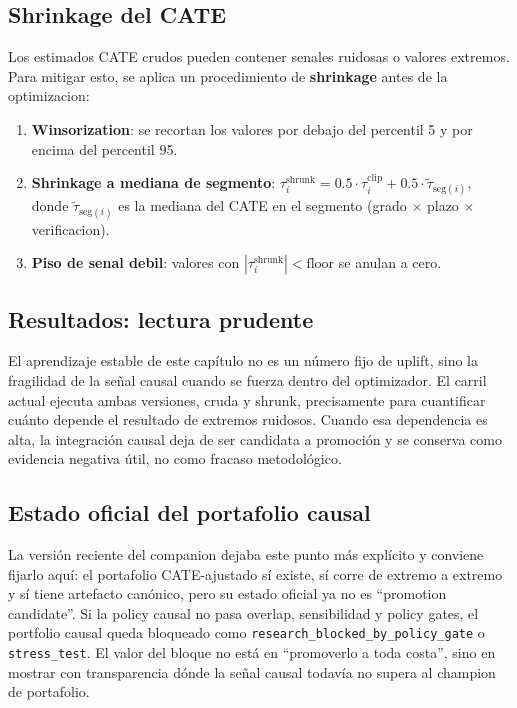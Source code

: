 \documentclass[
  spanish,
  11pt,
  letterpaper,
]{scrbook}
\providecommand{\tightlist}{%
  \setlength{\itemsep}{0pt}\setlength{\parskip}{0pt}}
\theoremstyle{plain}
\theoremstyle{remark}
\begin{document}
\subsection{Shrinkage del CATE}\label{shrinkage-del-cate}

Los estimados CATE crudos pueden contener senales ruidosas o valores
extremos. Para mitigar esto, se aplica un procedimiento de
\textbf{shrinkage} antes de la optimizacion:

\begin{enumerate}
\def\labelenumi{\arabic{enumi}.}
\tightlist
\item
  \textbf{Winsorization}: se recortan los valores por debajo del
  percentil 5 y por encima del percentil 95.
\item
  \textbf{Shrinkage a mediana de segmento}:
  \(\tau_i^{\text{shrunk}} = 0.5 \cdot \tau_i^{\text{clip}} + 0.5 \cdot \tilde{\tau}_{\text{seg}(i)}\),
  donde \(\tilde{\tau}_{\text{seg}(i)}\) es la mediana del CATE en el
  segmento (grado \(\times\) plazo \(\times\) verificacion).
\item
  \textbf{Piso de senal debil}: valores con
  \(|\tau_i^{\text{shrunk}}| < \text{floor}\) se anulan a cero.
\end{enumerate}

\subsection{Resultados: lectura
prudente}\label{resultados-lectura-prudente}

El aprendizaje estable de este capítulo no es un número fijo de uplift,
sino la fragilidad de la señal causal cuando se fuerza dentro del
optimizador. El carril actual ejecuta ambas versiones, cruda y shrunk,
precisamente para cuantificar cuánto depende el resultado de extremos
ruidosos. Cuando esa dependencia es alta, la integración causal deja de
ser candidata a promoción y se conserva como evidencia negativa útil, no
como fracaso metodológico.

\subsection{Estado oficial del portafolio
causal}\label{estado-oficial-del-portafolio-causal}

La versión reciente del companion dejaba este punto más explícito y
conviene fijarlo aquí: el portafolio CATE-ajustado sí existe, sí corre
de extremo a extremo y sí tiene artefacto canónico, pero su estado
oficial ya no es ``promotion candidate''. Si la policy causal no pasa
overlap, sensibilidad y policy gates, el portfolio causal queda
bloqueado como \texttt{research\_blocked\_by\_policy\_gate} o
\texttt{stress\_test}. El valor del bloque no está en ``promoverlo a
toda costa'', sino en mostrar con transparencia dónde la señal causal
todavía no supera al champion de portafolio.
\end{document}
